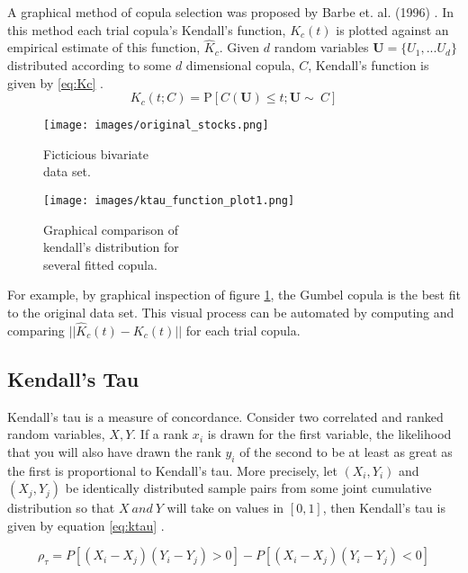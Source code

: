 A graphical method of copula selection was proposed by Barbe et. al. (1996) \cite{Barbe1996}.  In this method each trial copula's Kendall's function, $K_c(t)$ is plotted against an empirical estimate of this function, $\hat K_c$.  Given $d$ random variables $\mathbf U=\{U_1, ... U_d\}$ distributed according to some $d$ dimensional copula, $C$, Kendall's function is given by \ref{eq:Kc} \cite{Joe2015}.
\begin{equation}
K_c(t; C) = \mathrm P \left[C(\mathbf U) \leq t; \mathbf{U} \sim\ C\right]
\label{eq:Kc}
\end{equation}

\begin{figure}[!htbp]
\centering
\begin{minipage}{.45\textwidth}
  \texttt{[image: images/original\_stocks.png]}
\caption{Ficticious bivariate \\ data set.}
\label{fig:biv_data_ex}
\end{minipage}%
\begin{minipage}{.45\textwidth}
  \texttt{[image: images/ktau\_function\_plot1.png]}
\caption{Graphical comparison of  \\ kendall's distribution for \\ several fitted copula.}
\label{fig:kc_fn_compare}
\end{minipage}
\end{figure}
For example, by graphical inspection of figure \ref{fig:kc_fn_compare}, the Gumbel copula is the best fit to the original data set.  This visual process can be automated by computing and comparing $||\hat K_c(t) - K_c(t)||$ for each trial copula.

\subsection*{Kendall's Tau}

Kendall's tau is a measure of concordance.  Consider two correlated and ranked random variables, $X, Y$.
If a rank $x_i$ is drawn for the first variable, the likelihood that you will also have drawn the rank $y_i$ of the second to be at least as great as the first is proportional to Kendall's tau.  More precisely, let $(X_i, Y_i)$ and $(X_j, Y_j)$ be identically distributed sample pairs from some joint cumulative distribution so that $X\ and\ Y$ will take on values in $[0,1]$, then Kendall's tau is given by equation \ref{eq:ktau} \cite{Nelsen2006}.  

\begin{equation}
\rho_\tau = P[(X_i - X_j)(Y_i-Y_j)>0] - P[(X_i - X_j)(Y_i - Y_j)<0]
\label{eq:ktau}
\end{equation}

